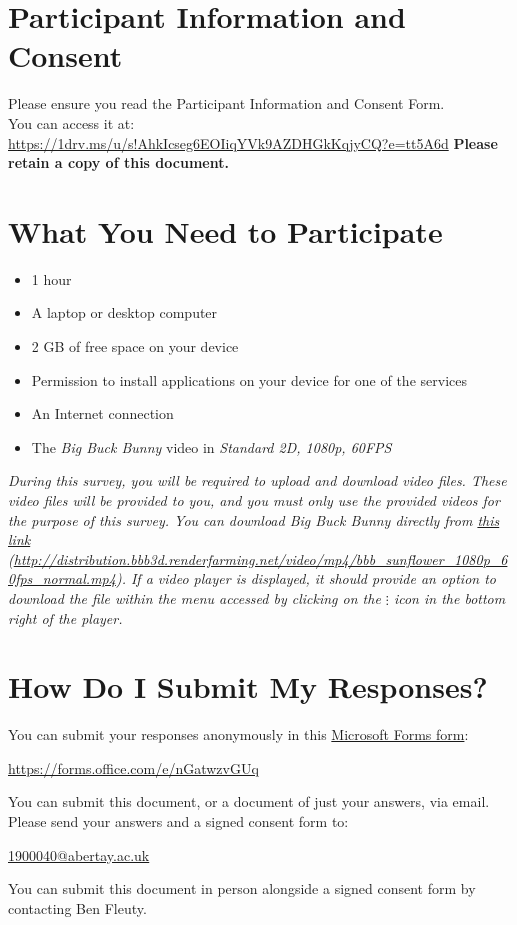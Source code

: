 \section{Participant Information and Consent}
Please ensure you read the Participant Information and Consent Form.
\\
You can access it at:
\\
\href{https://1drv.ms/u/s!AhkIcseg6EOIiqYVk9AZDHGkKqjyCQ?e=tt5A6d}{\url{https://1drv.ms/u/s!AhkIcseg6EOIiqYVk9AZDHGkKqjyCQ?e=tt5A6d}}
\newline
\textbf{Please retain a copy of this document.}

\section{What You Need to Participate}

\begin{itemize}
\item 1 hour
\item A laptop or desktop computer
\item 2 GB of free space on your device
\item Permission to install applications on your device for one of the services
\item An Internet connection
\item The \emph{Big Buck Bunny} video in \emph{Standard 2D, 1080p, 60FPS}
\end{itemize}

\emph{During this survey, you will be required to upload and download video files. These video files will be provided to you, and you must only use the provided videos for the purpose of this survey.
You can download Big Buck Bunny directly from \href{http://distribution.bbb3d.renderfarming.net/video/mp4/bbb_sunflower_1080p_60fps_normal.mp4}{this link} (\href{http://distribution.bbb3d.renderfarming.net/video/mp4/bbb_sunflower_1080p_60fps_normal.mp4}{\url{http://distribution.bbb3d.renderfarming.net/video/mp4/bbb_sunflower_1080p_60fps_normal.mp4}}). If a video player is displayed, it should provide an option to download the file within the menu accessed by clicking on the \textbf{$\vdots$} icon in the bottom right of the player.}

\section{How Do I Submit My Responses?}
You can submit your responses anonymously in this \href{https://forms.office.com/e/nGatwzvGUq}{Microsoft Forms form}:\newline
\centerline{ \href{https://forms.office.com/e/nGatwzvGUq}{\url{https://forms.office.com/e/nGatwzvGUq}}} \newline
You can submit this document, or a document of just your answers, via email. Please send your answers and a signed consent form to: \newline
\centerline{\href{mailto://1900040@abertay.ac.uk}{1900040@abertay.ac.uk}}\newline
You can submit this document in person alongside a signed consent form by contacting Ben Fleuty.

